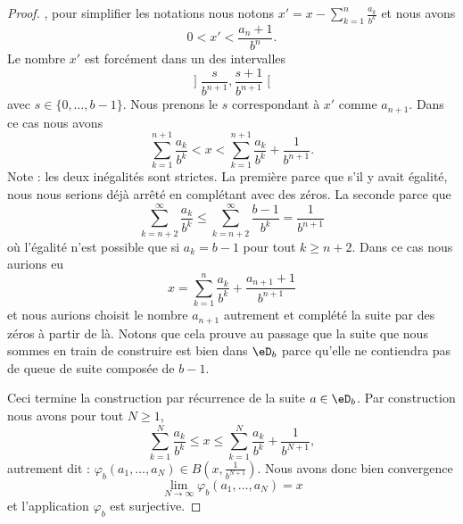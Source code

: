 \begin{proof}
        , pour simplifier les notations nous notons \( x'=x-\sum_{k=1}^{n}\frac{ a_k }{ b^k }\) et nous avons
        \begin{equation}
            0<x'<\frac{ a_n+1 }{ b^n }.
        \end{equation}
        Le nombre \( x'\) est forcément dans un des intervalles
        \begin{equation}
                \mathopen] \frac{ s }{ b^{n+1} } , \frac{ s+1 }{ b^{n+1} } \mathclose[
        \end{equation}
        avec \( s\in\{ 0,\ldots, b-1 \}\). Nous prenons le \( s\) correspondant à \( x'\) comme \( a_{n+1}\). Dans ce cas nous avons
        \begin{equation}
            \sum_{k=1}^{n+1}\frac{ a_k }{ b^k }< x<\sum_{k=1}^{n+1}\frac{ a_k }{ b^k }+\frac{1}{ b^{n+1} }.
        \end{equation}
        Note : les deux inégalités sont strictes. La première parce que s'il y avait égalité, nous nous serions déjà arrêté en complétant avec des zéros. La seconde parce que 
        \begin{equation}
            \sum_{k=n+2}^{\infty}\frac{ a_k }{ b^k }\leq \sum_{k=n+2}^{\infty}\frac{ b-1 }{ b^k }=\frac{1}{ b^{n+1} }
        \end{equation}
        où l'égalité n'est possible que si \( a_k=b-1\) pour tout \( k\geq n+2\). Dans ce cas nous aurions eu
        \begin{equation}
            x=\sum_{k=1}^{n}\frac{ a_k }{ b^k }+\frac{ a_{n+1}+1 }{ b^{n+1} }
        \end{equation}
        et nous aurions choisit le nombre \( a_{n+1}\) autrement et complété la suite par des zéros à partir de là. Notons que cela prouve au passage que la suite que nous sommes en train de construire est bien dans \( \eD_b\) parce qu'elle ne contiendra pas de queue de suite composée de \( b-1\).

        Ceci termine la construction par récurrence de la suite \( a\in \eD_b\). Par construction nous avons pour tout \( N\geq 1\),
        \begin{equation}
            \sum_{k=1}^N\frac{ a_k }{ b^k }\leq x\leq \sum_{k=1}^N\frac{ a_k }{ b^k }+\frac{1}{ b^{N+1} }, 
        \end{equation}
        autrement dit : \( \varphi_b(a_1,\ldots, a_N)\in B(x,\frac{1}{ b^{N+1} })\). Nous avons donc bien convergence
        \begin{equation}
            \lim_{N\to \infty} \varphi_b(a_1,\ldots, a_N)=x
        \end{equation}
        et l'application \( \varphi_b\) est surjective.
\end{proof}

